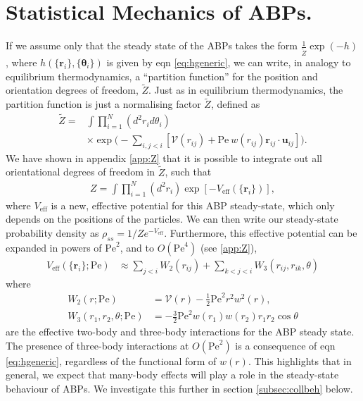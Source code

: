\documentclass[twocolumn,amsmath,amssymb,aps]{revtex4-1}%
\begin{document}
\section{Statistical Mechanics of ABPs.}
If we assume only that the steady state of the ABPs takes the form
$\frac{1}{\tilde{Z}}\exp(-h)$, where
$h(\{\bm{r}_i\},\{\bm{\theta}_i\})$ is given by eqn \ref{eq:hgeneric},
we can write, in analogy to
equilibrium thermodynamics, a ``partition function'' for the position and
orientation degrees of freedom, $\tilde{Z}$. Just as in equilibrium
thermodynamics,
the partition function is just a normalising factor
$\tilde{Z}$, defined as
\begin{align}\label{eq:Zori}
  \tilde{Z} =& \int\prod_{i=1}^N(d^2r_id\theta_i)\nonumber\\
  &\times\exp\bigg(-\sum_{i,j<i}[\mathcal{V}(r_{ij})
    +\mathrm{Pe}\:w(r_{ij})\bm{r}_{ij}\cdot\bm{u}_{ij}]\bigg).
\end{align}
We have shown in appendix \ref{app:Z}
that it is possible to integrate out all orientational degrees
of freedom in $\tilde{Z}$, such that
\begin{align}\label{eq:Z}
  Z = \int\prod_{i=1}^N(d^2r_i)\exp[-V_{\mathrm{eff}}(\{\bm{r}_i\})],
\end{align}
where $V_{\mathrm{eff}}$ is a new, effective potential for this ABP
steady-state, which only depends on the positions of the particles.
We can then write our steady-state probability density as
$\rho_{ss}=1/Ze^{-V_{\mathrm{eff}}}$. Furthermore, this effective
potential can be expanded in powers of $\mathrm{Pe}^2$,
and to $O(\mathrm{Pe}^4)$ (see \ref{app:Z}),
\begin{align}
  V_{\mathrm{eff}}(\{\bm{r}_i\};\mathrm{Pe})
  &\approx\sum_{j<i}W_2(r_{ij})
  +\sum_{k<j<i}W_3(r_{ij},r_{ik},\theta)
\end{align}
where
\begin{subequations}
  \label{eqs:2and3body}
  \begin{align}
    W_2(r;\mathrm{Pe})
    &= \mathcal{V}(r)
      -\frac{1}{2}\mathrm{Pe}^2 r^2w^2(r),\label{eq:2body}\\
    W_3(r_1,r_2,\theta;\mathrm{Pe})
    &= -\frac{3}{2}\mathrm{Pe}^2w(r_1)w(r_2)r_1r_2\cos\theta
      \label{eq:3body}
  \end{align}
\end{subequations}
are the effective two-body and three-body interactions for the ABP
steady state. The presence of three-body interactions at $O(\mathrm{Pe}^2)$
is a consequence of eqn \ref{eq:hgeneric}, regardless of the functional
form of $w(r)$. This highlights that in
general, we expect that many-body effects will play a role in the
steady-state behaviour of ABPs. We investigate this further in section
\ref{subsec:collbeh} below.
\end{document}
